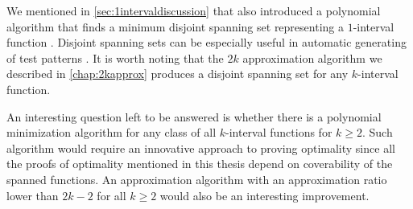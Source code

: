 We mentioned in \cref{sec:1intervaldiscussion}
that \citeauthor{Schieber2005154} also introduced
a polynomial algorithm that finds
a minimum disjoint spanning set
representing a $1$-interval function
\citep[Section 4]{Schieber2005154}.
Disjoint spanning sets can be
especially useful
in automatic generating of test patterns
\citep{Schieber2005154}.
It is worth noting that
the $2k$ approximation algorithm we described
in \cref{chap:2kapprox} produces a disjoint spanning set
for any $k$-interval function.

An interesting question left to be answered
is whether there is a polynomial minimization algorithm
for any class of all $k$-interval functions
for $k \geq 2$.
Such algorithm would require an innovative approach
to proving optimality
since all the proofs of optimality
mentioned in this thesis depend on coverability
of the spanned functions.
An approximation algorithm with an approximation ratio
lower than $2k-2$ for all $k \geq 2$
would also be an interesting improvement.
